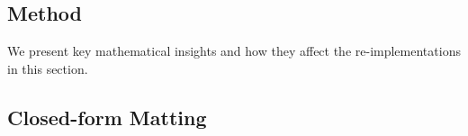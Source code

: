 \documentclass{article}
\theoremstyle{definition}
\begin{document}
\begin{multicols}{2}[]




\section{Method}


We present key mathematical insights and how they affect the re-implementations in this section.

\subsection{Closed-form Matting}\label{s3-closed-form-matting}


\end{multicols}
\end{document}
